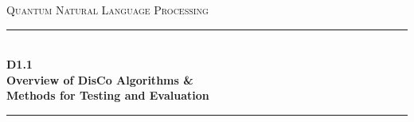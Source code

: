 \documentclass[11pt]{article}
\begin{document}
\begin{titlepage}
\newcommand{\HRule}{\rule{\linewidth}{0.1mm}} 
\center %
 
\vfill
\textsc{\LARGE Quantum Natural Language Processing}
\vfill
\HRule \\[0.4cm]
{ \Large \bfseries D1.1} \\[0.3cm]
{ \Large \bfseries Overview of DisCo Algorithms \& \\[0.1cm]Methods for Testing and Evaluation}\\[0.1cm]
\HRule \\[1.5cm]
 

\end{titlepage}
\end{document}
